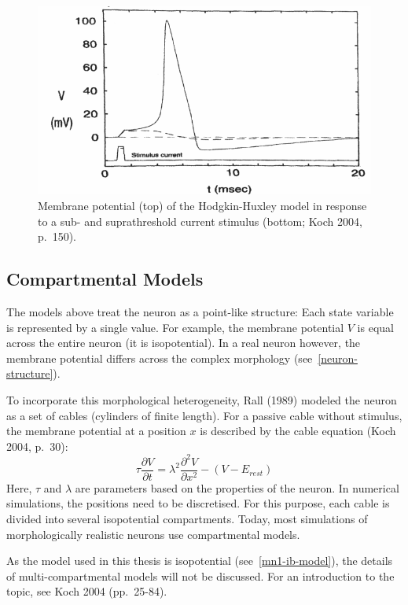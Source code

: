 \documentclass[12pt,a4paper,]{report}
\begin{document}
\begin{figure}
\centering
\includegraphics[width=0.600\hsize]{images/Koch_2004_p_150.png}
\caption[Membrane potential of the Hodgkin-Huxley model]{Membrane potential (top) of the Hodgkin-Huxley model
in response to a sub- and suprathreshold current stimulus (bottom; Koch
2004, p.~150).}\label{spike}
\end{figure}

\subsection{Compartmental Models}\label{compartmental-models}

The models above treat the neuron as a point-like structure: Each state
variable is represented by a single value. For example, the membrane
potential $V$ is equal across the entire neuron (it is isopotential). In
a real neuron however, the membrane potential differs across the complex
morphology (see~\ref{neuron-structure}).

To incorporate this morphological heterogeneity, Rall (1989) modeled the
neuron as a set of cables (cylinders of finite length). For a passive
cable without stimulus, the membrane potential at a position $x$ is
described by the cable equation (Koch 2004, p.~30):
%
\begin{equation}
\label{cable-equation}
\tau \frac{\partial V}{\partial t} = \lambda^2 \frac{\partial^2 V}{\partial x^2} - (V - E_{rest})
\end{equation}
%
 Here, $\tau$ and $\lambda$ are parameters based on the properties of
the neuron. In numerical simulations, the positions need to be
discretised. For this purpose, each cable is divided into several
isopotential compartments. Today, most simulations of morphologically
realistic neurons use compartmental models.

As the model used in this thesis is isopotential
(see~\ref{mn1-ib-model}), the details of multi-compartmental models will
not be discussed. For an introduction to the topic, see Koch 2004
(pp.~25-84).
\end{document}
